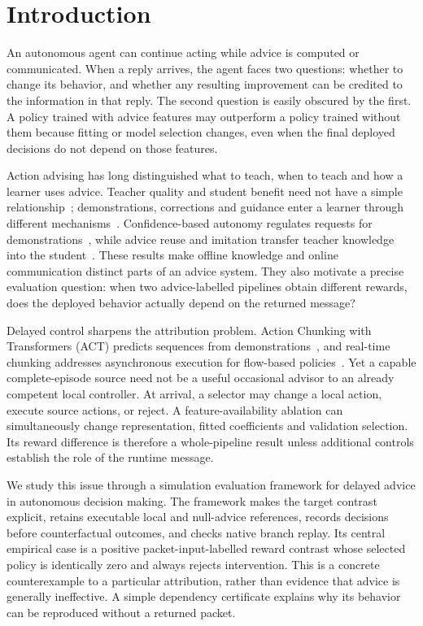 \section{Introduction}\label{sec:intro}
An autonomous agent can continue acting while advice is computed or communicated. When a reply arrives, the agent faces two questions: whether to change its behavior, and whether any resulting improvement can be credited to the information in that reply. The second question is easily obscured by the first. A policy trained with advice features may outperform a policy trained without them because fitting or model selection changes, even when the final deployed decisions do not depend on those features.

Action advising has long distinguished what to teach, when to teach and how a learner uses advice. Teacher quality and student benefit need not have a simple relationship~\cite{fachantidis}; demonstrations, corrections and guidance enter a learner through different mechanisms~\cite{najar}. Confidence-based autonomy regulates requests for demonstrations~\cite{chernova}, while advice reuse and imitation transfer teacher knowledge into the student~\cite{zhu,ilhan}. These results make offline knowledge and online communication distinct parts of an advice system. They also motivate a precise evaluation question: when two advice-labelled pipelines obtain different rewards, does the deployed behavior actually depend on the returned message?

Delayed control sharpens the attribution problem. Action Chunking with Transformers (ACT) predicts sequences from demonstrations~\cite{act}, and real-time chunking addresses asynchronous execution for flow-based policies~\cite{rtc}. Yet a capable complete-episode source need not be a useful occasional advisor to an already competent local controller. At arrival, a selector may change a local action, execute source actions, or reject. A feature-availability ablation can simultaneously change representation, fitted coefficients and validation selection. Its reward difference is therefore a whole-pipeline result unless additional controls establish the role of the runtime message.

We study this issue through a simulation evaluation framework for delayed advice in autonomous decision making. The framework makes the target contrast explicit, retains executable local and null-advice references, records decisions before counterfactual outcomes, and checks native branch replay. Its central empirical case is a positive packet-input-labelled reward contrast whose selected policy is identically zero and always rejects intervention. This is a concrete counterexample to a particular attribution, rather than evidence that advice is generally ineffective. A simple dependency certificate explains why its behavior can be reproduced without a returned packet.

